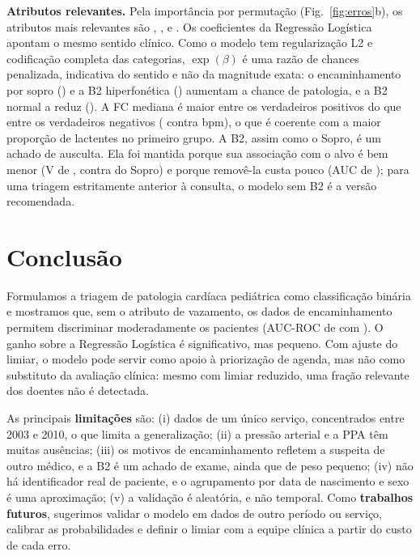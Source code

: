\documentclass[conference]{IEEEtran}
\begin{document}
\textbf{Atributos relevantes.} Pela importância por permutação (Fig.~\ref{fig:erros}b), os atributos mais relevantes são \impUm, \impDois, \impTres{} e \impQuatro. Os coeficientes da Regressão Logística apontam o mesmo sentido clínico. Como o modelo tem regularização L2 e codificação completa das categorias, $\exp(\beta)$ é uma razão de chances penalizada, indicativa do sentido e não da magnitude exata: o encaminhamento por sopro (\rcMotivoSopro) e a B2 hiperfonética (\rcBDoisHiper) aumentam a chance de patologia, e a B2 normal a reduz (\rcBDoisNormal). A FC mediana é maior entre os verdadeiros positivos do que entre os verdadeiros negativos (\fcVp{} contra \fcVn{} bpm), o que é coerente com a maior proporção de lactentes no primeiro grupo. A B2, assim como o Sopro, é um achado de ausculta. Ela foi mantida porque sua associação com o alvo é bem menor (V de \vBDois{}, contra \vSopro{} do Sopro) e porque removê-la custa pouco (AUC de \aucSemBDoisMelhor{}); para uma triagem estritamente anterior à consulta, o modelo sem B2 é a versão recomendada.

\section{Conclusão}

Formulamos a triagem de patologia cardíaca pediátrica como classificação binária e mostramos que, sem o atributo de vazamento, os dados de encaminhamento permitem discriminar moderadamente os pacientes (AUC-ROC de \aucMelhor{} com \melhorNome). O ganho sobre a Regressão Logística é significativo, mas pequeno. Com ajuste do limiar, o modelo pode servir como apoio à priorização de agenda, mas não como substituto da avaliação clínica: mesmo com limiar reduzido, uma fração relevante dos doentes não é detectada.

As principais \textbf{limitações} são: (i) dados de um único serviço, concentrados entre 2003 e 2010, o que limita a generalização; (ii) a pressão arterial e a PPA têm muitas ausências; (iii) os motivos de encaminhamento refletem a suspeita de outro médico, e a B2 é um achado de exame, ainda que de peso pequeno; (iv) não há identificador real de paciente, e o agrupamento por data de nascimento e sexo é uma aproximação; (v) a validação é aleatória, e não temporal. Como \textbf{trabalhos futuros}, sugerimos validar o modelo em dados de outro período ou serviço, calibrar as probabilidades e definir o limiar com a equipe clínica a partir do custo de cada erro.
\end{document}
